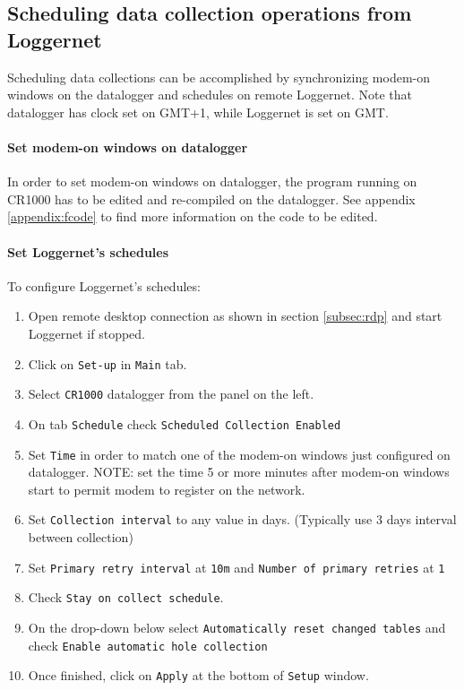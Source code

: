 \subsection{Scheduling data collection operations from Loggernet}
Scheduling data collections can be accomplished by synchronizing modem-on windows on the datalogger
and schedules on remote Loggernet. Note that datalogger has clock set on GMT+1, while Loggernet is set on
GMT.
\paragraph{Set modem-on windows on datalogger}
In order to set modem-on windows on datalogger, the program running on CR1000 has to be edited and re-compiled
on the datalogger. See appendix \ref{appendix:fcode} to find more information on the code to be edited.
\paragraph{Set Loggernet's schedules}
To configure Loggernet's schedules:
\begin{enumerate}
	\item Open remote desktop connection as shown in section \ref{subsec:rdp} and start Loggernet if stopped.
	\item Click on {\tt Set-up} in {\tt Main} tab.
	\item Select {\tt CR1000} datalogger from the panel on the left.
	\item On tab {\tt Schedule} check {\tt Scheduled Collection Enabled}
	\item Set {\tt Time} in order to match one of the modem-on windows just configured on datalogger. NOTE: set the time 5 or more minutes after
		  modem-on windows start to permit modem to register on the network.
	\item Set {\tt Collection interval} to any value in days. (Typically use 3 days interval between collection)
	\item Set {\tt Primary retry interval} at {\tt 10m} and {\tt Number of primary retries} at {\tt 1}
	\item Check {\tt Stay on collect schedule}.
	\item On the drop-down below select {\tt Automatically reset changed tables} and check {\tt Enable automatic hole collection}
	\item Once finished, click on {\tt Apply} at the bottom of {\tt Setup} window.
\end{enumerate}
